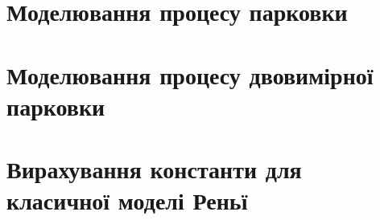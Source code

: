 \begin{appendices}

    	
	
    	
	\section*{Моделювання процесу парковки}
	
	\section*{Моделювання процесу двовимірної парковки}
	
	\section*{Вирахування константи для класичної моделі Реньї}
	
	
\end{appendices}
